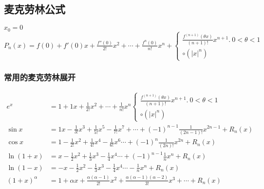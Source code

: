 \subsection{麦克劳林公式}
\begin{center}
    $x_0=0$\\
    $P_n(x)= f(0)+f'(0)x+\frac{f''(0)}{2!}x^2+\cdots+\frac{f^n(0)}{n!}x^n+\begin{cases}
        \frac{f^{(n+1)}(\theta x)}{(n+1)!}x^{n+1}.\ 0<\theta<1\\
        \circ(\left|x\right|^n)
    \end{cases}$
\end{center}
\subsubsection{常用的麦克劳林展开}
\begin{displaymath}
    \begin{split}
        e^x&=1+1x+\frac{1}{2!}x^2+\cdots+\frac{1}{n!}x^n\begin{cases}
        \frac{f^{(n+1)}(\theta x)}{(n+1)!}x^{n+1}.\ 0<\theta<1\\
        \circ(\left|x\right|^n)\end{cases}\\
    \sin x&=1x-\frac{1}{3!}x^3+\frac{1}{5!}x^5-\frac{1}{7!}x^7+\cdots+(-1)^{n-1}\frac{1}{(2n-1)!}x^{2n-1}+R_n(x)\\
    \cos x&=1-\frac{1}{2!}x^2+\frac{1}{4!}x^4-\frac{1}{6!}x^6\cdots+(-1)^{n}\frac{1}{(2n)!}x^{2n}+R_n(x)\\
    \ln(1+x)&=x-\frac{1}{2}x^2+\frac{1}{3}x^3-\frac{1}{4}x^4\cdots+(-1)^{n-1}\frac{1}{n}x^{n}+R_n(x)\\
        \ln(1-x)&=-x-\frac{1}{2}x^2-\frac{1}{3}x^3-\frac{1}{4}x^4\cdots-\frac{1}{n}x^{n}+R_n(x)\\
    (1+x)^\alpha&=1+\alpha x+\frac{\alpha(\alpha-1)}{2!}x^2+\frac{\alpha(\alpha-1)(\alpha-2)}{3!}x^3+\cdots+R_n(x)
    \end{split}
\end{displaymath}




